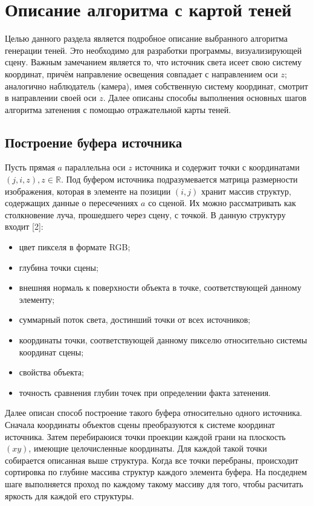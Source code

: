 \section{Описание алгоритма с картой теней} {
    Целью данного раздела является
    подробное описание выбранного алгоритма генерации теней.
    Это необходимо для разработки программы, визуализирующей сцену.
    Важным замечанием является то, что источник света исеет свою систему координат,
    причём направление освещения совпадает с направлением оси $z$;
    аналогично наблюдатель (камера), имея собственную систему координат,
    смотрит в направлении своей оси $z$.
    Далее описаны способы выполнения основных шагов алгоритма
    затенения с помощью отражательной карты теней.
    \subsection{Построение буфера источника} {
        Пусть прямая $a$ параллельна оси $z$ источника и содержит
        точки с координатами $(j, i, z), z \in \mathbb{R}$.
        Под буфером источника подразумевается матрица размерности изображения, которая
        в элементе на позиции $(i, j)$ хранит массив структур, содержащих данные о
        пересечениях $a$ со сценой.
        Их можно рассматривать как столкновение луча, прошедшего через сцену, с точкой.
        В данную структуру входит [2]:
        \begin{itemize}
            \item цвет пикселя в формате RGB;
            \item глубина точки сцены;
            \item внешняя нормаль к поверхности объекта в точке,
            соответствующей данному элементу;
            \item суммарный поток света, достинший точки от всех источников;
            \item координаты точки, соответствующей данному пикселю относительно
            системы координат сцены;
            \item свойства объекта;
            \item точность сравнения глубин точек
            при определении факта затенения.
        \end{itemize}
        Далее описан способ построение такого буфера относительно одного источника.
        Сначала координаты объектов сцены преобразуются к системе координат источника.
        Затем перебираюися точки проекции каждой грани на плоскость $(xy)$,
        имеющие целочисленные координаты.
        Для каждой такой точки собирается описанная выше структура.
        Когда все точки перебраны, происходит сортировка по глубине массива
        структур каждого элемента буфера.
        На посдеднем шаге выполняется проход по каждому такому массиву для того, чтобы
        расчитать яркость для каждой его структуры.
    }
}
